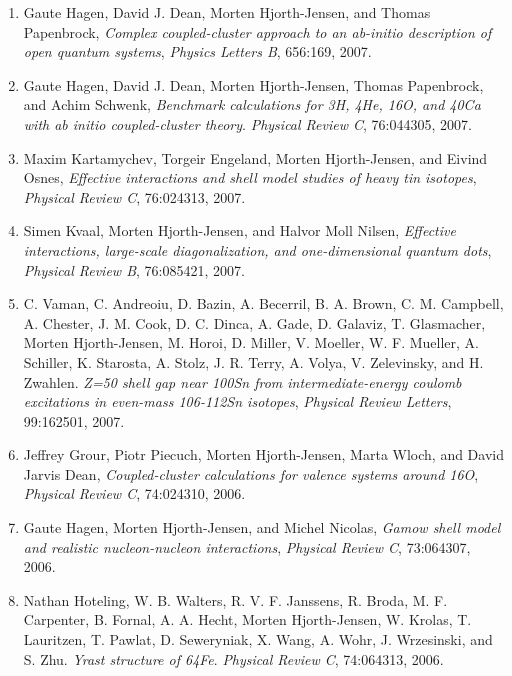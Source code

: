 \documentclass[%
oneside,                 %
final,                   %
10pt]{article}
\begin{document}
\begin{enumerate}
\item Gaute Hagen, David J. Dean, Morten Hjorth-Jensen, and Thomas Papenbrock,  \emph{Complex coupled-cluster approach to an ab-initio description of   open quantum systems},  \emph{Physics Letters B}, 656:169, 2007. 

\item Gaute Hagen, David J. Dean, Morten Hjorth-Jensen, Thomas Papenbrock, and Achim   Schwenk,  \emph{Benchmark calculations for 3H, 4He, 16O, and 40Ca with ab initio coupled-cluster theory}.  \emph{Physical Review C}, 76:044305, 2007. 

\item Maxim Kartamychev, Torgeir Engeland, Morten Hjorth-Jensen, and Eivind Osnes,  \emph{Effective interactions and shell model studies of heavy tin isotopes},  \emph{Physical Review C}, 76:024313, 2007. 

\item Simen Kvaal, Morten Hjorth-Jensen, and Halvor Moll Nilsen,  \emph{Effective interactions, large-scale diagonalization, and   one-dimensional quantum dots},  \emph{Physical Review B}, 76:085421, 2007. 

\item C. Vaman, C. Andreoiu, D. Bazin, A. Becerril, B. A. Brown, C. M. Campbell,   A. Chester, J. M. Cook, D. C. Dinca, A. Gade, D. Galaviz, T. Glasmacher,   Morten Hjorth-Jensen, M. Horoi, D. Miller, V. Moeller, W. F. Mueller,   A. Schiller, K. Starosta, A. Stolz, J. R. Terry, A. Volya, V. Zelevinsky, and   H. Zwahlen.  \emph{Z=50 shell gap near 100Sn from intermediate-energy coulomb excitations in even-mass 106-112Sn isotopes},  \emph{Physical Review Letters}, 99:162501, 2007. 

\item Jeffrey Grour, Piotr Piecuch, Morten Hjorth-Jensen, Marta Wloch, and   David Jarvis Dean, \emph{Coupled-cluster calculations for valence systems around 16O}, \emph{Physical Review C}, 74:024310, 2006. 

\item Gaute Hagen, Morten Hjorth-Jensen, and Michel Nicolas,  \emph{Gamow shell model and realistic nucleon-nucleon interactions},  \emph{Physical Review C}, 73:064307, 2006. 

\item Nathan Hoteling, W. B. Walters, R. V. F. Janssens, R. Broda, M. F. Carpenter,   B. Fornal, A. A. Hecht, Morten Hjorth-Jensen, W. Krolas, T. Lauritzen,   T. Pawlat, D. Seweryniak, X. Wang, A. Wohr, J. Wrzesinski, and S. Zhu.  \emph{Yrast structure of 64Fe}.  \emph{Physical Review C}, 74:064313, 2006. 


\end{enumerate}
\end{document}
